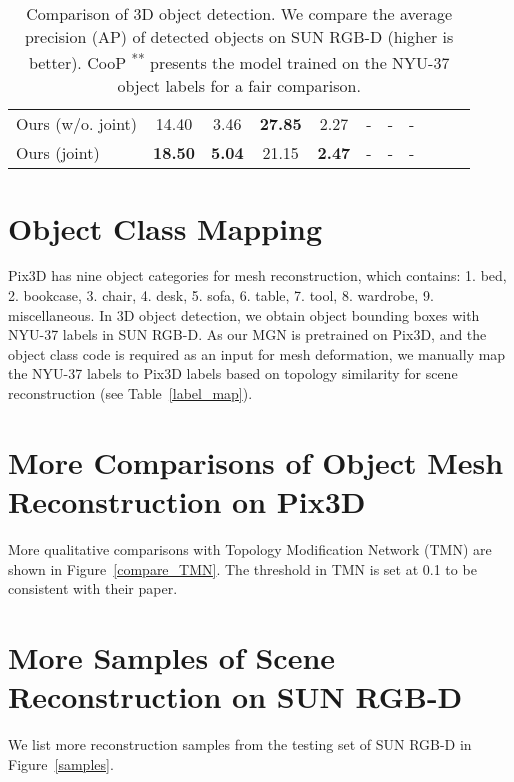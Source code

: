 \documentclass[10pt,twocolumn,letterpaper]{article}
\begin{document}
\begin{table*}[!h]
\begin{center}
{\begin{tabular}{|l|c|c|c|c|c|c|c|c|c|c|}
				Ours (w/o. joint) & 14.40 & 3.46 & \textbf{27.85} & 2.27 & - & - & - &  &  & \\
				Ours (joint) & \textbf{18.50} & \textbf{5.04} & 21.15 & \textbf{2.47} & - & - & - &  &  & \\
				\hline
		\end{tabular}}
	\end{center}
	\caption{Comparison of 3D object detection. We compare the average precision (AP) of detected objects on SUN RGB-D (higher is better). CooP \cite{huang2018cooperative}\textsuperscript{**} presents the model trained on the NYU-37 object labels for a fair comparison.}
	\label{compare:more3ddetection}
\end{table*}


\section{Object Class Mapping}
Pix3D has nine object categories for mesh reconstruction, which contains: 1. bed, 2. bookcase, 3. chair, 4. desk, 5. sofa, 6. table, 7. tool, 8. wardrobe, 9. miscellaneous. In 3D object detection, we obtain object bounding boxes with NYU-37 labels in SUN RGB-D. As our MGN is pretrained on Pix3D, and the object class code is required as an input for mesh deformation, we manually map the NYU-37 labels to Pix3D labels based on topology similarity for scene reconstruction (see Table~\ref{label_map}).

\section{More Comparisons of Object Mesh Reconstruction on Pix3D}
More qualitative comparisons with Topology Modification Network (TMN) \cite{Junyi} are shown in Figure~\ref{compare_TMN}. The threshold  in TMN is set at 0.1 to be consistent with their paper.

\section{More Samples of Scene Reconstruction on SUN RGB-D}
We list more reconstruction samples from the testing set of SUN RGB-D in Figure~\ref{samples}.
\end{document}
